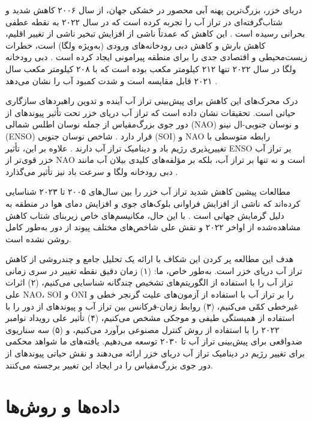 \documentclass[12pt,a4paper,twocolumn]{article}
\begin{document}
دریای خزر، بزرگ‌ترین پهنه آبی محصور در خشکی جهان، از سال ۲۰۰۶ کاهش شدید و شتاب‌گرفته‌ای در تراز آب را تجربه کرده است که در سال ۲۰۲۲ به نقطه عطفی بحرانی رسیده است \citep{channelnewsasia2024, cabar2024}. این کاهش که عمدتاً ناشی از افزایش تبخیر ناشی از تغییر اقلیم، کاهش بارش و کاهش دبی رودخانه‌های ورودی (به‌ویژه ولگا) است، خطرات زیست‌محیطی و اقتصادی جدی را برای منطقه پیرامونی ایجاد کرده است \citep{core2025, springer2025}. دبی رودخانه ولگا در سال ۲۰۲۲ تنها ۲۱۲ کیلومتر مکعب بوده است که با ۲۰۸ کیلومتر مکعب سال ۲۰۲۱ قابل مقایسه است و شدت کمبود آب را نشان می‌دهد \citep{cabar2023}.

درک محرک‌های این کاهش برای پیش‌بینی تراز آب آینده و تدوین راهبردهای سازگاری حیاتی است. تحقیقات نشان داده است که تراز آب دریای خزر تحت تأثیر پیوندهای از دور جوی بزرگ‌مقیاس از جمله نوسان اطلس شمالی (NAO) و نوسان جنوبی-ال نینو (ENSO) قرار دارد \citep{nature2025, openpolar2025}. شاخص نوسان جنوبی (SOI) و NAO رابطه متوسطی با تغییرپذیری رژیم باد و دینامیک تراز آب دارند \citep{nature2025}. علاوه بر این، تأثیر ENSO بر تراز آب خزر قوی‌تر از NAO است و نه تنها بر تراز آب، بلکه بر مؤلفه‌های کلیدی بیلان آب مانند دبی رودخانه ولگا و سرعت باد نیز تأثیر می‌گذارد \citep{openpolar2025}.

مطالعات پیشین کاهش شدید تراز آب خزر را بین سال‌های ۲۰۰۵ تا ۲۰۲۳ شناسایی کرده‌اند که ناشی از افزایش فراوانی بلوک‌های جوی و افزایش دمای هوا در منطقه به دلیل گرمایش جهانی است \citep{springer2025}. با این حال، مکانیسم‌های خاص زیربنای شتاب کاهش مشاهده‌شده از اواخر ۲۰۲۲ و نقش علی شاخص‌های مختلف پیوند از دور به‌طور کامل روشن نشده است.

هدف این مطالعه پر کردن این شکاف با ارائه یک تحلیل جامع و چندروشی از کاهش تراز آب دریای خزر است. به‌طور خاص، ما: (۱) زمان دقیق نقطه تغییر در سری زمانی تراز آب را با استفاده از الگوریتم‌های تشخیص چندگانه شناسایی می‌کنیم، (۲) اثرات علی NAO، SOI و ONI را بر تراز آب با استفاده از آزمون‌های علیت گرنجر خطی و غیرخطی کمّی می‌کنیم، (۳) روابط زمان-فرکانس بین تراز آب و پیوندهای از دور را با استفاده از همبستگی طیفی و موجکی مشخص می‌کنیم، (۴) تأثیر علی رویداد نوامبر ۲۰۲۲ را با استفاده از روش کنترل مصنوعی برآورد می‌کنیم، و (۵) سه سناریوی ضدواقعی برای پیش‌بینی تراز آب تا ۲۰۳۰ توسعه می‌دهیم. یافته‌های ما شواهد محکمی برای تغییر رژیم در دینامیک تراز آب دریای خزر ارائه می‌دهند و نقش حیاتی پیوندهای از دور جوی بزرگ‌مقیاس را در ایجاد این تغییر برجسته می‌کنند.

\section{داده‌ها و روش‌ها}
\end{document}
